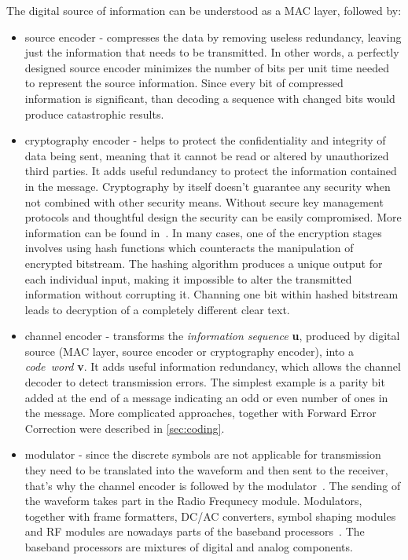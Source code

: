 The digital source of information can be understood as a MAC layer, followed by:
\begin{itemize}
    \item source encoder - compresses the data by removing useless redundancy, leaving just the information that needs to be transmitted. In other words, a perfectly designed source encoder minimizes the number of bits per unit time needed to represent the source information. Since every bit of compressed information is significant, than decoding a sequence with changed bits would produce catastrophic results.
    \item cryptography encoder - helps to protect the confidentiality and integrity of data being sent, meaning that it cannot be read or altered by unauthorized third parties. It adds useful redundancy to protect the information contained in the message. Cryptography by itself doesn't guarantee any security when not combined with other security means. Without secure key management protocols and thoughtful design the security can be easily compromised. More information can be found in~\cite{Cryptography}. In many cases, one of the encryption stages involves using hash functions which counteracts the manipulation of encrypted bitstream. The hashing algorithm produces a unique output for each individual input, making it impossible to alter the transmitted information without corrupting it. Channing one bit within hashed bitstream leads to decryption of a completely different clear text.
    \item channel encoder - transforms the \textit{information sequence} \textbf{u}, produced by digital source (MAC layer, source encoder or cryptography encoder), into a \textit{code~word} \textbf{v}. It adds useful information redundancy, which allows the channel decoder to detect transmission errors. The simplest example is a parity bit added at the end of a message indicating an odd or even number of ones in the message. More complicated approaches, together with Forward Error Correction were described in \autoref{sec:coding}.
    \item modulator - since the discrete symbols are not applicable for transmission they need to be translated into the waveform and then sent to the receiver, that's why the channel encoder is followed by the modulator~\cite{book:LinCostello}. The sending of the waveform takes part in the Radio Frequnecy module. Modulators, together with frame formatters, DC/AC converters, symbol shaping modules and RF modules are nowadays parts of the baseband processors~\cite{book:Ismail}. The baseband processors are mixtures of digital and analog components.
\end{itemize}
